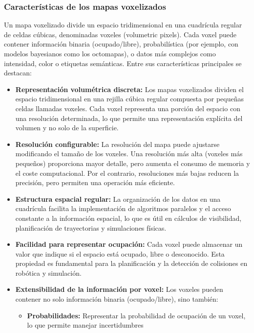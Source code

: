 \documentclass[12pt, a4paper, twoside]{article}
\begin{document}
\subsubsection{Características de los mapas voxelizados}

Un mapa voxelizado divide un espacio tridimensional en una cuadrícula regular de celdas cúbicas, denominadas voxeles 
(volumetric pixels). Cada voxel puede contener información binaria (ocupado/libre), probabilística (por ejemplo, con modelos 
bayesianos como los octomapas), o datos más complejos como intensidad, color o etiquetas semánticas. Entre sus características 
principales se destacan:

\begin{itemize}
  \item \textbf{Representación volumétrica discreta:} Los mapas voxelizados dividen el espacio tridimensional en una rejilla cúbica 
  regular compuesta por pequeñas celdas llamadas voxeles. Cada voxel representa una porción del espacio con una resolución 
  determinada, lo que permite una representación explícita del volumen y no solo de la superficie.
  \item \textbf{Resolución configurable:} La resolución del mapa puede ajustarse modificando el tamaño de los voxeles. Una 
  resolución más alta (voxeles más pequeños) proporciona mayor detalle, pero aumenta el consumo de memoria y el coste 
  computacional. Por el contrario, resoluciones más bajas reducen la precisión, pero permiten una operación más eficiente.
  \item \textbf{Estructura espacial regular:} La organización de los datos en una cuadrícula facilita la implementación de 
  algoritmos paralelos y el acceso constante a la información espacial, lo que es útil en cálculos de visibilidad, planificación 
  de trayectorias y simulaciones físicas.
  \item \textbf{Facilidad para representar ocupación:} Cada voxel puede almacenar un valor que indique si el espacio está ocupado, 
  libre o desconocido. Esta propiedad es fundamental para la planificación y la detección de colisiones en robótica y simulación.
  \item \textbf{Extensibilidad de la información por voxel:} Los voxeles pueden contener no solo información binaria (ocupado/libre), 
  sino también:
  \begin{itemize}
    \item \textbf{Probabilidades:} Representar la probabilidad de ocupación de un voxel, lo que permite manejar incertidumbres 

\end{itemize}
\end{itemize}
\end{document}
